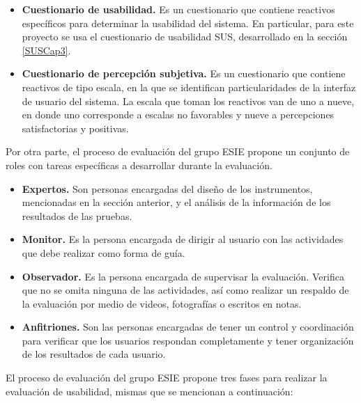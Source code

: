 \begin{itemize}
  \item \textbf{Cuestionario de usabilidad.} Es un cuestionario que contiene reactivos específicos para determinar la usabilidad del sistema. En particular, para este proyecto se usa el cuestionario de usabilidad SUS, desarrollado en la sección \ref{SUSCap3}.
  \item \textbf{Cuestionario de percepción subjetiva.} Es un cuestionario que contiene reactivos de tipo escala, en la que se identifican particularidades de la interfaz de usuario del sistema. La escala que toman los reactivos van de uno a nueve, en donde uno corresponde a escalas no favorables y nueve a percepciones satisfactorias y positivas.
\end{itemize}

Por otra parte, el proceso de evaluación del grupo ESIE propone un conjunto de roles con tareas específicas a desarrollar durante la evaluación.

\begin{itemize}
  \item \textbf{Expertos.} Son personas encargadas del diseño de los instrumentos, mencionadas en la sección anterior, y el análisis de la información de los resultados de las pruebas.
  \item \textbf{Monitor.} Es la persona encargada de dirigir al usuario con las actividades que debe realizar como forma de guía.
  \item \textbf{Observador.} Es la persona encargada de supervisar la evaluación. Verifica que no se omita ninguna de las actividades, así como realizar un respaldo de la evaluación por medio de videos, fotografías o escritos en notas.
  \item \textbf{Anfitriones.} Son las personas encargadas de tener un control y coordinación para verificar que los usuarios respondan completamente y tener organización de los resultados de cada usuario.
\end{itemize}

El proceso de evaluación del grupo ESIE propone tres fases para realizar la evaluación de usabilidad, mismas que se mencionan a continuación:

